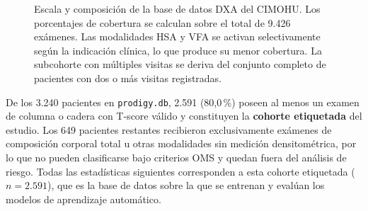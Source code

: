 \documentclass[../tesis.tex]{subfiles}
\begin{document}
\begin{figure}[ht]
\caption[Escala y composición de la base de datos DXA del CIMOHU]{Escala y composición de la base de datos DXA del CIMOHU\@.
Los porcentajes de cobertura se calculan sobre el total de 9.426 exámenes.
Las modalidades HSA y VFA se activan selectivamente según la indicación clínica, lo
que produce su menor cobertura. La subcohorte con múltiples visitas se deriva del conjunto completo
de pacientes con dos o más visitas registradas.}
\label{fig:cimohu_schema}
\end{figure}

De los 3.240 pacientes en \texttt{prodigy.db}, 2.591 (80{,}0\,\%) poseen al menos un examen de columna o cadera con T-score válido y constituyen la \textbf{cohorte etiquetada} del estudio. Los 649 pacientes restantes recibieron exclusivamente exámenes de composición corporal total u otras modalidades sin medición densitométrica, por lo que no pueden clasificarse bajo criterios OMS y quedan fuera del análisis de riesgo. Todas las estadísticas siguientes corresponden a esta cohorte etiquetada ($n = 2.591$), que es la base de datos sobre la que se entrenan y evalúan los modelos de aprendizaje automático.
\end{document}
